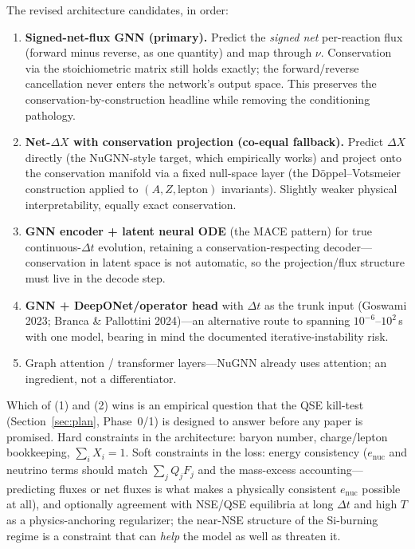 \documentclass[11pt,a4paper]{article}
\begin{document}
The revised architecture candidates, in order:

\begin{enumerate}[leftmargin=2em]
  \item \textbf{Signed-net-flux GNN (primary).} Predict the \emph{signed net} per-reaction flux (forward minus reverse, as one quantity) and map through $\nu$. Conservation via the stoichiometric matrix still holds exactly; the forward/reverse cancellation never enters the network's output space. This preserves the conservation-by-construction headline while removing the conditioning pathology.
  \item \textbf{Net-$\Delta X$ with conservation projection (co-equal fallback).} Predict $\Delta X$ directly (the NuGNN-style target, which empirically works) and project onto the conservation manifold via a fixed null-space layer (the D\"oppel--Votsmeier construction applied to $(A, Z, \text{lepton})$ invariants). Slightly weaker physical interpretability, equally exact conservation.
  \item \textbf{GNN encoder + latent neural ODE} (the MACE pattern) for true continuous-$\Delta t$ evolution, retaining a conservation-respecting decoder---conservation in latent space is not automatic, so the projection/flux structure must live in the decode step.
  \item \textbf{GNN + DeepONet/operator head} with $\Delta t$ as the trunk input (Goswami 2023; Branca \& Pallottini 2024)---an alternative route to spanning $10^{-6}$--$10^{2}$\,s with one model, bearing in mind the documented iterative-instability risk.
  \item Graph attention / transformer layers---NuGNN already uses attention; an ingredient, not a differentiator.
\end{enumerate}

Which of (1) and (2) wins is an empirical question that the QSE kill-test (Section~\ref{sec:plan}, Phase~0/1) is designed to answer before any paper is promised. Hard constraints in the architecture: baryon number, charge/lepton bookkeeping, $\sum_i X_i = 1$. Soft constraints in the loss: energy consistency ($e_{\mathrm{nuc}}$ and neutrino terms should match $\sum_j Q_j F_j$ and the mass-excess accounting---predicting fluxes or net fluxes is what makes a physically consistent $e_{\mathrm{nuc}}$ possible at all), and optionally agreement with NSE/QSE equilibria at long $\Delta t$ and high $T$ as a physics-anchoring regularizer; the near-NSE structure of the Si-burning regime is a constraint that can \emph{help} the model as well as threaten it.
\end{document}

